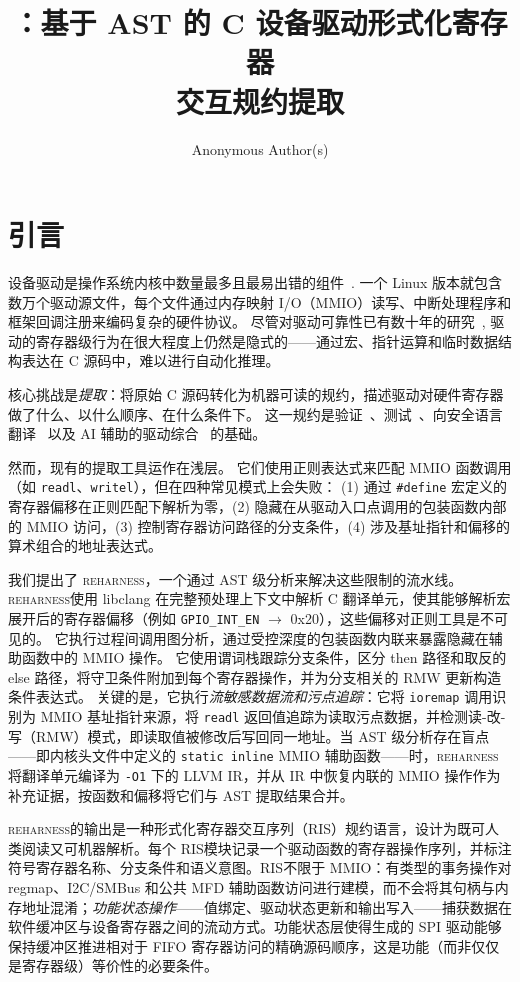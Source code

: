 \documentclass[sigplan, screen, review, anonymous]{acmart}
\title{\reharness：基于 AST 的 C 设备驱动形式化寄存器\\交互规约提取}
\author{Anonymous Author(s)}
\affiliation{%
  \institution{Anonymous Institution}
  \city{Anonymous City}
  \country{Anonymous Country}
}
\newcommand{\reharness}{\textsc{reharness}}
\newcommand{\rislang}{RIS}
\begin{document}
\maketitle

\section{引言}

设备驱动是操作系统内核中数量最多且最易出错的组件~\cite{chou2001empirical,swift2003improving}. 一个 Linux 版本就包含数万个驱动源文件，每个文件通过内存映射 I/O（MMIO）读写、中断处理程序和框架回调注册来编码复杂的硬件协议。 尽管对驱动可靠性已有数十年的研究~\cite{ball2006thorough,ryzhyk2009dingo,kadav2009tolerating}, 驱动的寄存器级行为在很大程度上仍然是隐式的——通过宏、指针运算和临时数据结构表达在 C 源码中，难以进行自动化推理。

核心挑战是\emph{提取}：将原始 C 源码转化为机器可读的规约，描述驱动对硬件寄存器做了什么、以什么顺序、在什么条件下。 这一规约是验证~\cite{witkowski2007automated}、测试~\cite{cadar2008klee}、向安全语言翻译~\cite{emrath2021c2rust} 以及 AI 辅助的驱动综合~\cite{roelofs2023large} 的基础。

然而，现有的提取工具运作在浅层。 它们使用正则表达式来匹配 MMIO 函数调用（如 \texttt{readl}、\texttt{writel}），但在四种常见模式上会失败： (1) 通过 \texttt{\#define} 宏定义的寄存器偏移在正则匹配下解析为零，(2) 隐藏在从驱动入口点调用的包装函数内部的 MMIO 访问，(3) 控制寄存器访问路径的分支条件，(4) 涉及基址指针和偏移的算术组合的地址表达式。

我们提出了 \reharness，一个通过 AST 级分析来解决这些限制的流水线。 \reharness 使用 libclang 在完整预处理上下文中解析 C 翻译单元，使其能够解析宏展开后的寄存器偏移（例如 \texttt{GPIO\_INT\_EN} $\rightarrow$ 0x20），这些偏移对正则工具是不可见的。 它执行过程间调用图分析，通过受控深度的包装函数内联来暴露隐藏在辅助函数中的 MMIO 操作。 它使用谓词栈跟踪分支条件，区分 then 路径和取反的 else 路径，将守卫条件附加到每个寄存器操作，并为分支相关的 RMW 更新构造条件表达式。 关键的是，它执行\emph{流敏感数据流和污点追踪}：它将 \texttt{ioremap} 调用识别为 MMIO 基址指针来源，将 \texttt{readl} 返回值追踪为读取污点数据，并检测读-改-写（RMW）模式，即读取值被修改后写回同一地址。当 AST 级分析存在盲点——即内核头文件中定义的 \texttt{static inline} MMIO 辅助函数——时，\reharness 将翻译单元编译为 \texttt{-O1} 下的 LLVM IR，并从 IR 中恢复内联的 MMIO 操作作为补充证据，按函数和偏移将它们与 AST 提取结果合并。

\reharness 的输出是一种形式化寄存器交互序列（\rislang）规约语言，设计为既可人类阅读又可机器解析。每个 \rislang 模块记录一个驱动函数的寄存器操作序列，并标注符号寄存器名称、分支条件和语义意图。\rislang 不限于 MMIO：有类型的事务操作对 regmap、I2C/SMBus 和公共 MFD 辅助函数访问进行建模，而不会将其句柄与内存地址混淆；\emph{功能状态操作}——值绑定、驱动状态更新和输出写入——捕获数据在软件缓冲区与设备寄存器之间的流动方式。功能状态层使得生成的 SPI 驱动能够保持缓冲区推进相对于 FIFO 寄存器访问的精确源码顺序，这是功能（而非仅仅是寄存器级）等价性的必要条件。
\end{document}
